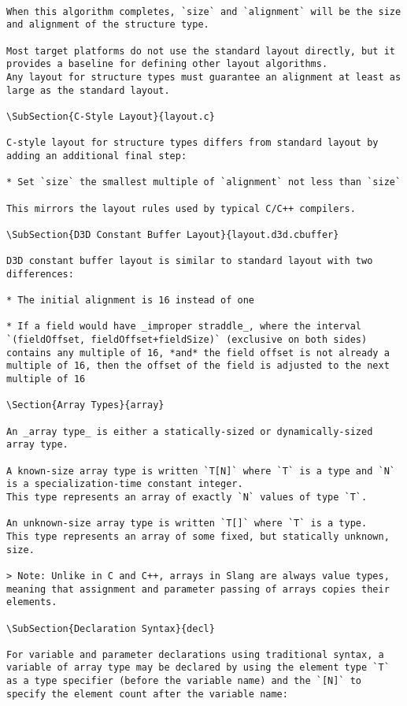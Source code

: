 \begin{verbatim}

When this algorithm completes, `size` and `alignment` will be the size and alignment of the structure type.

Most target platforms do not use the standard layout directly, but it provides a baseline for defining other layout algorithms.
Any layout for structure types must guarantee an alignment at least as large as the standard layout.

\SubSection{C-Style Layout}{layout.c}

C-style layout for structure types differs from standard layout by adding an additional final step:

* Set `size` the smallest multiple of `alignment` not less than `size`

This mirrors the layout rules used by typical C/C++ compilers.

\SubSection{D3D Constant Buffer Layout}{layout.d3d.cbuffer}

D3D constant buffer layout is similar to standard layout with two differences:

* The initial alignment is 16 instead of one

* If a field would have _improper straddle_, where the interval `(fieldOffset, fieldOffset+fieldSize)` (exclusive on both sides) contains any multiple of 16, *and* the field offset is not already a multiple of 16, then the offset of the field is adjusted to the next multiple of 16

\Section{Array Types}{array}

An _array type_ is either a statically-sized or dynamically-sized array type.

A known-size array type is written `T[N]` where `T` is a type and `N` is a specialization-time constant integer.
This type represents an array of exactly `N` values of type `T`.

An unknown-size array type is written `T[]` where `T` is a type.
This type represents an array of some fixed, but statically unknown, size.

> Note: Unlike in C and C++, arrays in Slang are always value types, meaning that assignment and parameter passing of arrays copies their elements.

\SubSection{Declaration Syntax}{decl}

For variable and parameter declarations using traditional syntax, a variable of array type may be declared by using the element type `T` as a type specifier (before the variable name) and the `[N]` to specify the element count after the variable name:


\end{verbatim}

